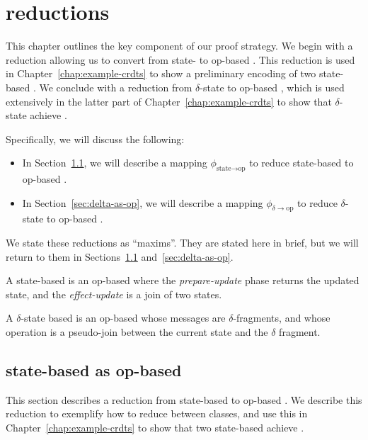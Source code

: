 \chapter{\CRDT reductions}
\label{chap:crdt-reductions}

This chapter outlines the key component of our proof strategy. We begin with a
reduction allowing us to convert from state- to op-based \CRDTs. This reduction
is used in Chapter~\ref{chap:example-crdts} to show a preliminary encoding of
two state-based \CRDTs. We conclude with a reduction from $\delta$-state to
op-based \CRDTs, which is used extensively in the latter part of
Chapter~\ref{chap:example-crdts} to show that $\delta$-state \CRDTs achieve
\SEC.

Specifically, we will discuss the following:
\begin{itemize}
  \item In Section~\ref{sec:state-as-op}, we will describe a mapping
    $\phi_{\text{state} \to \text{op}}$ to reduce state-based \CRDTs to op-based
    \CRDTs.
  \item In Section~\ref{sec:delta-as-op}, we will describe a mapping
    $\phi_{\delta \to \text{op}}$ to reduce $\delta$-state \CRDTs to op-based
    \CRDTs.
\end{itemize}

We state these reductions as ``maxims''. They are stated here in brief, but we
will return to them in Sections~\ref{sec:state-as-op} and~\ref{sec:delta-as-op}.

\begin{maxim}
  \label{maxim:state-as-op}
  A state-based \CRDT is an op-based \CRDT where the \emph{prepare-update} phase
  returns the updated state, and the \emph{effect-update} is a join of two
  states.
\end{maxim}

\begin{maxim}
  \label{maxim:delta-as-op}
  A $\delta$-state based \CRDT is an op-based \CRDT whose messages are
  $\delta$-fragments, and whose operation is a pseudo-join between the current
  state and the $\delta$ fragment.
\end{maxim}

\section{state-based \CRDTs as op-based}
\label{sec:state-as-op}

This section describes a reduction from state-based \CRDTs to op-based \CRDTs.
We describe this reduction to exemplify how to reduce between \CRDT classes, and
use this in Chapter~\ref{chap:example-crdts} to show that two state-based \CRDTs
achieve \SEC.

